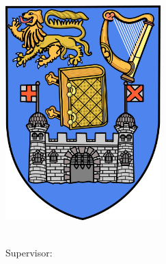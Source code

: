 
\begin{titlepage}

\begin{addmargin}[-1cm]{-3cm}
\begin{center}
\large

\hfill
\vfill

\begingroup
\color{Maroon}\spacedallcaps{\myTitle} \\ \bigskip %
\endgroup
\mySubtitle \\ \medskip %

\spacedlowsmallcaps{\myName} %

\vfill

\includegraphics[width=6cm]{gfx/trinity} \\ \medskip %

\myDegree \\
Supervisor: \myProf \\
\myUni \\ \bigskip


\vfill

\end{center}
\end{addmargin}

\end{titlepage}
